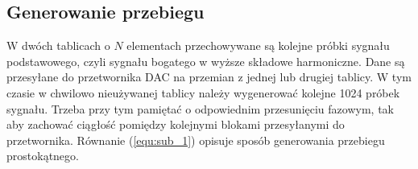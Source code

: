 \subsection{Generowanie przebiegu}
W dwóch tablicach o $N$ elementach przechowywane są kolejne próbki sygnału podstawowego, czyli sygnału bogatego w wyższe składowe harmoniczne. 
Dane są przesyłane do przetwornika DAC na przemian z jednej lub drugiej tablicy.
W tym czasie w chwilowo nieużywanej tablicy należy wygenerować kolejne 1024 próbek sygnału. Trzeba przy tym pamiętać o odpowiednim przesunięciu fazowym, tak aby zachować ciągłość pomiędzy kolejnymi blokami przesyłanymi do przetwornika. Równanie (\ref{equ:sub_1}) opisuje sposób generowania przebiegu prostokątnego.

